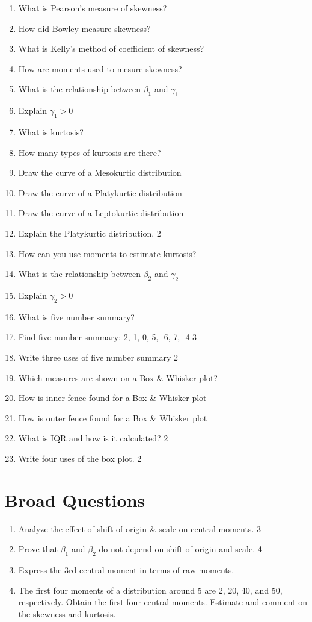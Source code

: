 \documentclass[a4paper,oneside]{book}
\begin{document}
\begin{enumerate}
    \item What is Pearson's measure of skewness?
    \item How did Bowley measure skewness?
    \item What is Kelly's method of coefficient of skewness?
    \item How are moments used to mesure skewness?
    \item What is the relationship between $\beta_1$ and $\gamma_1$
    \item Explain $\gamma_1>0$
    \item What is kurtosis?
    \item How many types of kurtosis are there?
    \item Draw the curve of a Mesokurtic distribution
    \item Draw the curve of a Platykurtic distribution
    \item Draw the curve of a Leptokurtic distribution
    \item Explain the Platykurtic distribution. \hfill 2
    \item How can you use moments to estimate kurtosis?
    \item What is the relationship between $\beta_2$ and $\gamma_2$
    \item Explain $\gamma_2>0$
    \item What is five number summary?
    \item Find five number summary: 2, 1, 0, 5, -6, 7, -4 \hfill 3
    \item Write three uses of five number summary \hfill 2
    \item Which measures are shown on a Box \& Whisker plot?
    \item How is inner fence found for a Box \& Whisker plot
    \item How is outer fence found for a Box \& Whisker plot
    \item What is IQR and how is it calculated? \hfill 2
    \item Write four uses of the box plot. \hfill 2
    \end{enumerate}

\section{Broad Questions}
    \begin{enumerate}
    \item Analyze the effect of shift of origin \& scale on central moments. \hfill 3
    \item Prove that $\beta_1$ and $\beta_2$ do not depend on shift of origin and scale. \hfill 4
    \item Express the 3rd central moment in terms of raw moments. 
    \item The first four moments of a distribution around 5 are 2, 20, 40, and 50, respectively. Obtain the first four central moments. Estimate and comment on the skewness and kurtosis. 
    \end{enumerate}
\end{document}
